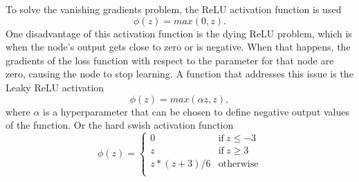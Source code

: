 To solve the vanishing gradients problem, the \gls{ReLU} activation function is used
\begin{equation*}
    \phi(z) = max(0, z).
\end{equation*}
One disadvantage of this activation function is the dying \gls{ReLU} problem, which is when the node's output gets close to zero or is negative.
When that happens, the gradients of the loss function with respect to the parameter for that node are zero, causing the node to stop learning.
A function that addresses this issue is the Leaky \gls{ReLU} activation
\begin{equation*}
    \phi(z) = max(\alpha z, z),
\end{equation*}
where $\alpha$ is a hyperparameter that can be chosen to define negative output values of the function.
Or the hard swish activation function \cite{howardSearchingMobileNetV32019}
\begin{equation*}
\phi(z)=\begin{cases}
    0 & \text{if}\ z \leq -3 \\
    z & \text{if}\ z \geq 3 \\
    z * (z + 3) / 6 & \text{otherwise}  \\
\end{cases}
\end{equation*}